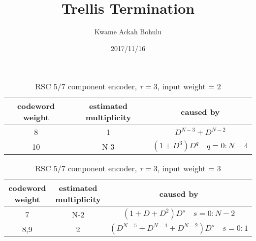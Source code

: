 \documentclass[20 pts]{article}
\title{Trellis Termination}
\author{Kwame Ackah Bohulu}
\date{2017/11/16}
\begin{document}
\maketitle

\newpage
\begin{table}[h!]
\begin{center}
 \begin{tabular}{|| c | c | c ||} 
 
 \hline
 codeword weight & estimated multiplicity & caused by  \\ [0.5ex] 
 \hline\hline
 8 &1& $D^{N-3}+D^{N-2}$ \\ 
 \hline
 10 & N-3 & $(1+D^{3})D^q\,\,\,\,\,\, q=0:N-4$ \\  
 \hline
\end{tabular}
\end{center}
\caption{RSC 5/7 component encoder, $\tau=3$, input weight = 2}
\end{table}

\begin{table}[h!]
\begin{center}
 \begin{tabular}{|| c | c | c ||} 
 
 \hline
 codeword weight & estimated multiplicity & caused by  \\ [0.5ex] 
 \hline\hline
 7 &N-2& $(1+ D+D^{2})D^s \,\,\,\,\,\, s=0:N-2$ \\ 
 \hline
 8,9 & 2 & $(D^{N-5}+ D^{N-4}+D^{N-2})D^s \,\,\,\,\,\, s=0:1$ \\  
 \hline
\end{tabular}
\end{center}
\caption{RSC 5/7 component encoder, $\tau=3$, input weight = 3}
\end{table}
\end{document}
